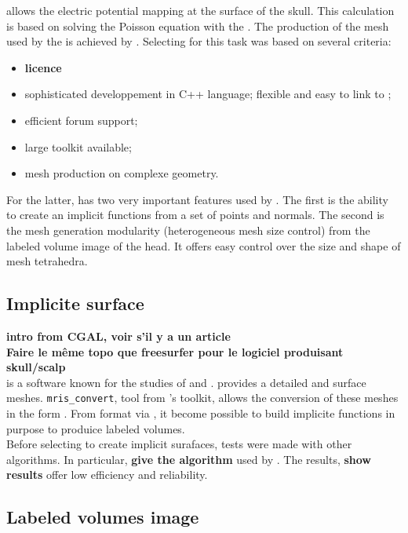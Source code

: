 \FIJEE{} allows the electric potential mapping at the surface of the skull. This calculation is based on solving the Poisson equation with the \FEM{}. The production of the mesh used by the \FEM{} is achieved by \CGAL{}. Selecting \CGAL{} for this task was based on several criteria:


\begin{itemize}
\item {\bf licence}
\item sophisticated developpement in C++ language; flexible and easy to link to \FIJEE{};
\item efficient forum support;
\item large toolkit available;
\item mesh production on complexe geometry.
\end{itemize}

For the latter, \CGAL{} has two very important features used by \FIJEE{}. The first is the ability to create an implicit functions from a set of points and normals. The second is the mesh generation modularity (heterogeneous mesh size control) from the labeled volume image of the head.  It offers easy control over the size and shape of mesh tetrahedra.\\

\subsection{Implicite surface}

{\bf intro from CGAL, voir s'il y a un article}\\
{\bf Faire le même topo que freesurfer pour le logiciel produisant skull/scalp}\\

\FREESURFER{} is a software known for the studies of \WM{} and \GM{}. \FREESURFER{} provides a detailed \WM{} and \GM{} surface meshes. \texttt{mris\_convert}, tool from \FREESURFER{}'s toolkit, allows the conversion of these meshes in the form \STL{}. From \STL{} format via \CGAL{}, it become possible to build implicite functions in purpose to produice labeled  volumes. \\
Before selecting \CGAL{} to create implicit surafaces, tests were made with other algorithms. In particular, {\bf give the algorithm} used by \VTK{}. The results, {\bf show results} offer low efficiency and reliability. \\

\subsection{Labeled volumes image}

